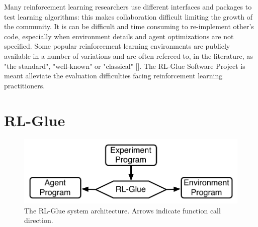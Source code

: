 \documentclass[twopage,11pt]{article}
\begin{document}
 


Many reinforcement learning researchers use different interfaces and packages to test learning algorithms: this makes collaboration difficult limiting the growth of the community. It is can be difficult and time consuming to re-implement other's code, especially when environment details and agent optimizations are not specified. Some popular reinforcement learning environments are publicly available in a number of variations and are often refereed to, in the literature, as "the standard", "well-known" or "classical" [\cite{whiteThesis}]. The RL-Glue Software Project is meant alleviate the evaluation difficulties facing reinforcement learning practitioners.




















 



	 

\section{RL-Glue}

\begin{figure}[h]
\begin{center}
\includegraphics[width = 9 cm]{glue.pdf}
\vspace{-0.2cm}
\caption{\small The RL-Glue system architecture. Arrows indicate function call direction.}\label{fig:RLDIA}
\end{center}
\vspace{-0.4cm}
\end{figure}
\end{document}
